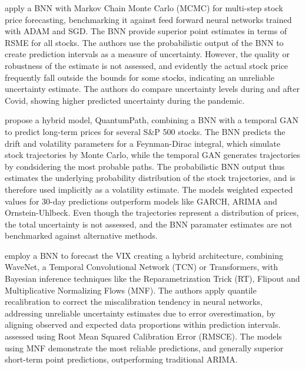 \textcite{chandra2021bayesian} apply a BNN with Markov Chain Monte Carlo (MCMC) for multi-step stock price forecasting, benchmarking it against feed forward neural networks trained with ADAM and SGD. The BNN provide superior point estimates in terms of RSME for all stocks. The authors use the probabilistic output of the BNN to create prediction intervals as a measure of uncertainty. However, the quality or robustness of the estimate is not assessed, and evidently the actual stock price frequently fall outside the bounds for some stocks, indicating an unreliable uncertainty estimate. The authors do compare uncertainty levels during and after Covid, showing higher predicted uncertainty during the pandemic.

\textcite{soleymani2022longterm} propose a hybrid model, QuantumPath, combining a BNN with a temporal GAN to predict long-term prices for several S\&P 500 stocks. The BNN predicts the drift and volatility parameters for a Feynman-Dirac integral, which simulate stock trajectories by Monte Carlo, while the temporal GAN generates trajectories by condsidering the most probable paths. The probabilistic BNN output thus estimates the underlying probability distribution of the stock trajectories, and is therefore used implicitly as a volatility estimate. The models weighted expected values for 30-day predictions outperform models like GARCH, ARIMA and Ornstein-Uhlbeck. Even though the trajectories represent a distribution of prices, the total uncertainty is not assessed, and the BNN paramater estimates are not benchmarked against alternative methods.

\textcite{hortua2024forecasting} employ a BNN to forecast the VIX creating a hybrid architecture, combining WaveNet, a Temporal Convolutional Network (TCN) or  Transformers, with Bayesian inference techniques like the Reparametrization Trick (RT), Flipout and Multiplicative Normalizing Flows (MNF). The authors apply quantile recalibration to correct the miscalibration tendency in neural networks, addressing unreliable uncertainty estimates due to error overestimation, by aligning observed and expected data proportions within prediction intervals. assessed using Root Mean Squared Calibration Error (RMSCE). The models using MNF demonstrate the most reliable predictions, and generally superior short-term point predictions, outperforming traditional ARIMA. 

